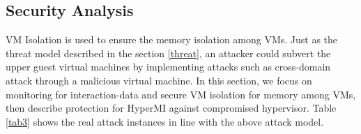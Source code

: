 \documentclass[conference]{IEEEtran}
\begin{document}
\subsection{Security Analysis}






VM Isolation is used to ensure the memory isolation among VMs. Just as the threat model described in the section \ref{threat}, an attacker could subvert the upper guest virtual machines 
by implementing attacks such as cross-domain attack through a malicious virtual machine.
In this section, we focus on monitoring for interaction-data and secure VM isolation for memory among VMs, then describe protection for HyperMI against compromised hypervisor. Table \ref{tab3} shows the real attack instances in line with the above attack model. 

\end{document}

